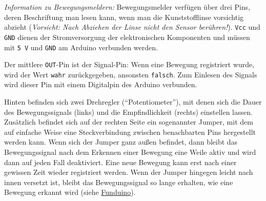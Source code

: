 \emph{Information zu Bewegungsmeldern:} Bewegungsmelder verfügen über drei Pins, deren Beschriftung man lesen kann, wenn man die Kunststofflinse vorsichtig abzieht (\emph{Vorsicht: Nach Abziehen der Linse nicht den Sensor berühren!}). \texttt{Vcc} und \texttt{GND} dienen der Stromversorgung der elektronischen Komponenten und müssen mit \texttt{5\,V} und \texttt{GND} am Arduino verbunden werden. 

Der mittlere \texttt{OUT}-Pin ist der Signal-Pin: Wenn eine Bewegung registriert wurde, wird der Wert \texttt{wahr} zurückgegeben, ansonsten \texttt{falsch}. Zum Einlesen des Signals wird dieser Pin mit einem Digitalpin des Arduino verbunden.

Hinten befinden sich zwei Drehregler (\enquote{Potentiometer}), mit denen sich die Dauer des Bewegungssignals (links) und die Empfindlichkeit (rechts) einstellen lassen. Zusätzlich befindet sich auf der rechten Seite ein sogenannter Jumper, mit dem auf einfache Weise eine Steckverbindung zwischen benachbarten Pins hergestellt werden kann. Wenn sich der Jumper ganz außen befindet, dann bleibt das Bewegungssignal nach dem Erkennen einer Bewegung eine Weile aktiv und wird dann auf jeden Fall deaktiviert. Eine neue Bewegung kann erst nach einer gewissen Zeit wieder registriert werden. Wenn der Jumper hingegen leicht nach innen versetzt ist, bleibt das Bewegungssignal so lange erhalten, wie eine Bewegung erkannt wird (siehe \href{https://funduino.de/nr-8-bewegungsmelder}{Funduino}).

